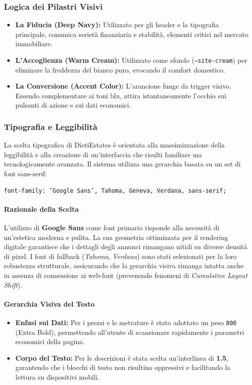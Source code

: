 \documentclass{article}
\begin{document}
\subsubsection{Logica dei Pilastri Visivi}
\begin{itemize}
    \item \textbf{La Fiducia (Deep Navy):} Utilizzato per gli header e la tipografia principale, comunica serietà finanziaria e stabilità, elementi critici nel mercato immobiliare.
    \item \textbf{L'Accoglienza (Warm Cream):} Utilizzato come sfondo (\texttt{--site-cream}) per eliminare la freddezza del bianco puro, evocando il comfort domestico.
    \item \textbf{La Conversione (Accent Color):} L'arancione funge da trigger visivo. Essendo complementare ai toni blu, attira istantaneamente l'occhio sui pulsanti di azione e sui dati economici.
\end{itemize}

\subsubsection{Tipografia e Leggibilità}
La scelta tipografica di DietiEstates è orientata alla massimizzazione della leggibilità e alla creazione di un'interfaccia che risulti familiare ma tecnologicamente avanzata. Il sistema utilizza una gerarchia basata su un set di font sans-serif:
\begin{center}
    \texttt{font-family: 'Google Sans', Tahoma, Geneva, Verdana, sans-serif;}
\end{center}

\paragraph{Razionale della Scelta}
L'utilizzo di \textbf{Google Sans} come font primario risponde alla necessità di un'estetica moderna e pulita. La sua geometria ottimizzata per il rendering digitale garantisce che i dettagli degli annunci rimangano nitidi su diverse densità di pixel. I font di fallback (\textit{Tahoma}, \textit{Verdana}) sono stati selezionati per la loro robustezza strutturale, assicurando che la gerarchia visiva rimanga intatta anche in assenza di connessione ai web-font (prevenendo fenomeni di \textit{Cumulative Layout Shift}).

\paragraph{Gerarchia Visiva del Testo}
\begin{itemize}
    \item \textbf{Enfasi sui Dati:} Per i prezzi e le metrature è stato adottato un peso \texttt{800} (Extra Bold), permettendo all'utente di scansionare rapidamente i parametri economici della pagina.
    \item \textbf{Corpo del Testo:} Per le descrizioni è stata scelta un'interlinea di \textbf{1.5}, garantendo che i blocchi di testo non risultino oppressivi e facilitando la lettura su dispositivi mobili.
\end{itemize}
\end{document}
